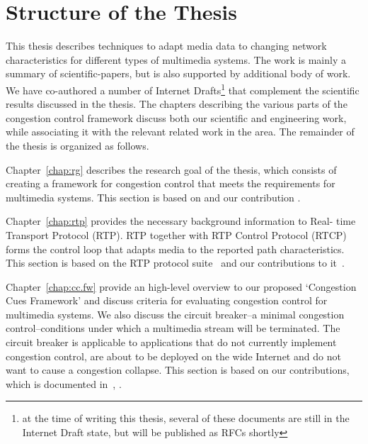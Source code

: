 \section{Structure of the Thesis}

This thesis describes techniques to adapt media data to changing network
characteristics for different types of multimedia systems. The work is mainly
a summary of scientific-papers, but is also supported by additional body of
work. We have co-authored a number of Internet Drafts\footnote{at the time of
writing this thesis, several of these documents are still in the Internet
Draft state, but will be published as RFCs shortly} that complement the
scientific results discussed in the thesis. The chapters describing the
various parts of the congestion control framework discuss both our scientific
and engineering work, while associating it with the relevant related work in
the area. The remainder of the thesis is organized as follows.

Chapter~\ref{chap:rg} describes the research goal of the thesis, which
consists of creating a framework for congestion control that meets the
requirements for multimedia systems. This section is based on
\cite{draft.rmcat.req} and our contribution \cite{Singh:control.loops.api}.


Chapter~\ref{chap:rtp} provides the necessary background information to Real-
time Transport Protocol (RTP). RTP together with RTP Control Protocol (RTCP)
forms the control loop that adapts media to the reported path characteristics.
This section is based on the RTP protocol suite~\cite{rfc3550, rfc4585,
rfc3611, rfc5104, rfc5506} and our contributions to
it~\cite{draft.xr.discard.rle, draft.xr.jb, draft.xr.bytes.discarded}.


Chapter~\ref{chap:cc.fw} provide an high-level overview to our proposed
`Congestion Cues Framework' and discuss criteria for evaluating congestion
control for multimedia systems. We also discuss the circuit breaker--a minimal
congestion control--conditions under which a multimedia stream will be
terminated. The circuit breaker is applicable to applications that do not
currently implement congestion control, are about to be deployed on the wide
Internet and do not want to cause a congestion collapse. This section is based
on our contributions, which is documented in~\cite{draft.rmcat.evaluate,
Singh:PhDFw, draft.rtp.cb}, .


